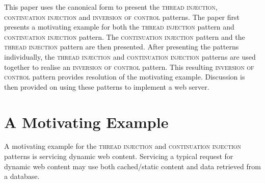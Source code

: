 \documentclass[prodmode]{style/acmlarge}
\begin{document}
\begin{table}[t]
\label{tab:ProactorParticipants}
\end{table}

This paper uses the canonical form to present the \textsc{thread injection},
\textsc{continuation injection} and \textsc{inversion of control} patterns.  The
paper first presents a motivating example for both the \textsc{thread injection}
pattern and \textsc{continuation injection} pattern.  The \textsc{continuation
injection} pattern and the \textsc{thread injection} pattern are then presented.
After presenting the patterns individually, the \textsc{thread injection} and
\textsc{continuation injection} patterns are used together to realise an
\textsc{inversion of control} pattern.  This resulting \textsc{inversion of control}
pattern provides resolution of the motivating example.  Discussion is then
provided on using these patterns to implement a web server.


\section{A Motivating Example}

A motivating example for the \textsc{thread injection} and \textsc{continuation
injection} patterns is servicing dynamic web content.  Servicing a typical
request for dynamic web content may use both cached/static content and data
retrieved from a database.
\end{document}
